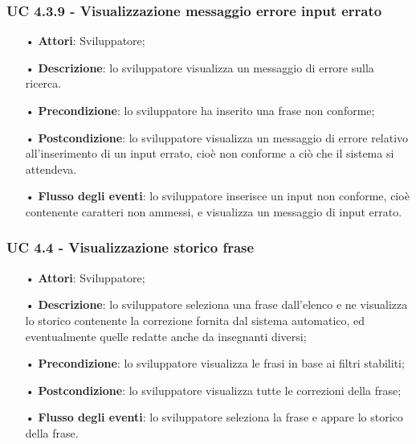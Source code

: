 \subsubsection{UC 4.3.9 - Visualizzazione messaggio errore input errato}
\begin{itemize}
	\item[•]\textbf{Attori}: Sviluppatore;
	\item[•]\textbf{Descrizione}: lo sviluppatore visualizza un messaggio di errore sulla ricerca.
	\item[•]\textbf{Precondizione}: lo sviluppatore ha inserito una frase non conforme;
	\item[•]\textbf{Postcondizione}: lo sviluppatore visualizza un messaggio di errore relativo 
	all'inserimento di un input errato, cioè non conforme a ciò che il sistema si attendeva.
	\item[•]\textbf{Flusso degli eventi}: lo sviluppatore inserisce un input non conforme, cioè contenente caratteri non ammessi, e visualizza un messaggio di input errato.
\end{itemize}

\subsubsection{UC 4.4 - Visualizzazione storico frase}
\begin{itemize}
	\item[•]\textbf{Attori}: Sviluppatore;
	\item[•]\textbf{Descrizione}: lo sviluppatore seleziona una frase dall'elenco e ne visualizza lo storico contenente la correzione fornita dal sistema automatico, ed eventualmente quelle redatte anche da insegnanti diversi;
	\item[•]\textbf{Precondizione}: lo sviluppatore visualizza le frasi in base ai filtri stabiliti;
	\item[•]\textbf{Postcondizione}: lo sviluppatore visualizza tutte le correzioni della frase;
	\item[•]\textbf{Flusso degli eventi}: lo sviluppatore seleziona la frase e appare lo storico della frase.
\end{itemize}

